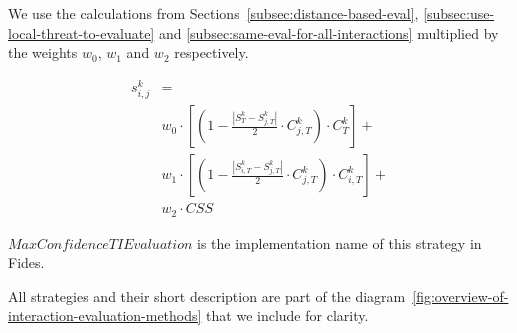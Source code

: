 We use the calculations from Sections~\ref{subsec:distance-based-eval}, \ref{subsec:use-local-threat-to-evaluate} and \ref{subsec:same-eval-for-all-interactions} multiplied by the weights $w_0$, $w_1$ and $w_2$ respectively.

\begin{equation}
\begin{split}
    s^{k}_{i, j} &= \\
    &w_{0} \cdot \left[\left(1 - \frac{|{S}^{k}_{T} - S^{k}_{j, T}|}{2} \cdot C^{k}_{j, T}\right) \cdot C^{k}_{T}\right] + \\
    &w_{1} \cdot \left[\left(1 - \frac{|{S}^{k}_{i, T} - S^{k}_{j, T}|}{2} \cdot C^{k}_{j, T}\right) \cdot C^{k}_{i, T}\right] + \\
    &w_{2} \cdot CSS
\end{split}
\end{equation}

\noindent
$MaxConfidenceTIEvaluation$ is the implementation name of this strategy in Fides.

\vspace{1cm}

\noindent
All strategies and their short description are part of the diagram~\ref{fig:overview-of-interaction-evaluation-methods} that we include for clarity.

